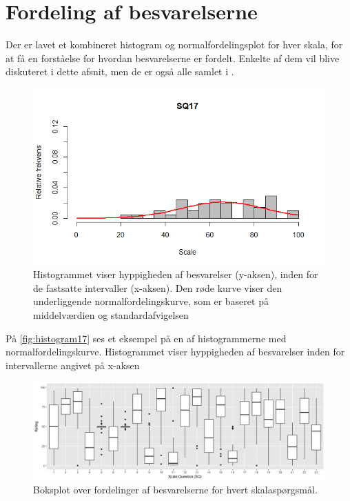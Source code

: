 \section{Fordeling af besvarelserne}
\label{TestAfSkalaFordeling}
%
Der er lavet et kombineret histogram og normalfordelingsplot for hver skala, for at få en forståelse for hvordan besvarelserne er fordelt. Enkelte af dem vil blive diskuteret i dette afsnit, men de er også alle samlet i .

\begin{figure}[H]
\centering
\includegraphics[width = \textwidth]{Figure/DatabehandlingSkalaer/HistogramNormalFordeling/SQ17} 
\caption{Histogrammet viser hyppigheden af besvarelser (y-aksen), inden for de fastsatte intervaller (x-aksen). Den røde kurve viser den underliggende normalfordelingskurve, som er baseret på middelværdien og standardafvigelsen}
\label{fig:histogram17}
\end{figure}
\noindent
%

På \autoref{fig:histogram17} ses et eksempel på en af histogrammerne med normalfordelingskurve. Histogrammet viser hyppigheden af besvarelser inden for intervallerne angivet på x-aksen

\begin{figure}[H]
\centering
\includegraphics[width = \textwidth]{Figure/DatabehandlingSkalaer/boksplot0er} 
\caption{Boksplot over fordelinger af besvarelserne for hvert skalaspørgsmål.}
\label{fig:boksplots}
\end{figure}
\noindent
%


